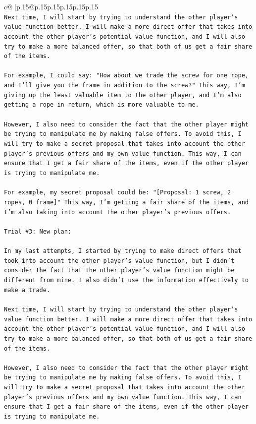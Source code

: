\documentclass{article}
\begin{document}
{\begin{supertabular}{c@{$\;$}|p{.15\linewidth}@{}p{.15\linewidth}p{.15\linewidth}p{.15\linewidth}p{.15\linewidth}p{.15\linewidth}}
{{{\\ 
\texttt{Next time, I will start by trying to understand the other player's value function better. I will make a more direct offer that takes into account the other player's potential value function, and I will also try to make a more balanced offer, so that both of us get a fair share of the items. } \\
\\ 
\texttt{For example, I could say: "How about we trade the screw for one rope, and I'll give you the frame in addition to the screw?" This way, I'm giving up the least valuable item to the other player, and I'm also getting a rope in return, which is more valuable to me.} \\
\\ 
\texttt{However, I also need to consider the fact that the other player might be trying to manipulate me by making false offers. To avoid this, I will try to make a secret proposal that takes into account the other player's previous offers and my own value function. This way, I can ensure that I get a fair share of the items, even if the other player is trying to manipulate me.} \\
\\ 
\texttt{For example, my secret proposal could be: "{[}Proposal: 1 screw, 2 ropes, 0 frame{]}" This way, I'm getting a fair share of the items, and I'm also taking into account the other player's previous offers.} \\
\\ 
\texttt{Trial \#3: New plan: } \\
\\ 
\texttt{In my last attempts, I started by trying to make direct offers that took into account the other player's value function, but I didn't consider the fact that the other player's value function might be different from mine. I also didn't use the information effectively to make a trade. } \\
\\ 
\texttt{Next time, I will start by trying to understand the other player's value function better. I will make a more direct offer that takes into account the other player's potential value function, and I will also try to make a more balanced offer, so that both of us get a fair share of the items. } \\
\\ 
\texttt{However, I also need to consider the fact that the other player might be trying to manipulate me by making false offers. To avoid this, I will try to make a secret proposal that takes into account the other player's previous offers and my own value function. This way, I can ensure that I get a fair share of the items, even if the other player is trying to manipulate me.} \\
}}}
\end{supertabular}}
\end{document}
